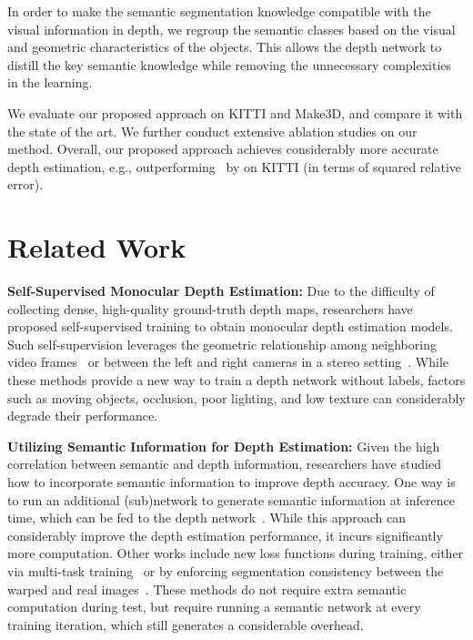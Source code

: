 \documentclass{bmvc2k}
\begin{document}
\hangindent=24pt 
\textbullet \hspace{2pt} In order to make the semantic segmentation knowledge compatible with the visual information in depth, we regroup the semantic classes based on the visual and geometric characteristics of the objects. This allows the depth network to distill the key semantic knowledge while removing the unnecessary complexities in the learning.

\hangindent=24pt 
\textbullet \hspace{2pt} We evaluate our proposed approach on KITTI and Make3D, and compare it with the state of the art. We further conduct extensive ablation studies on our method. Overall, our proposed approach achieves considerably more accurate depth estimation, e.g., outperforming~\cite{godard2019digging} by  on KITTI (in terms of squared relative error). 

\vspace{-10pt}
\section{Related Work}\label{sec:related work}
\vspace{-8pt}
\noindent \textbf{Self-Supervised Monocular Depth Estimation:}
Due to the difficulty of collecting dense, high-quality ground-truth depth maps, researchers have proposed self-supervised training to obtain monocular depth estimation models. Such self-supervision leverages the geometric relationship among neighboring video frames~\cite{zhou2017unsupervised, godard2019digging} or between the left and right cameras in a stereo setting~\cite{godard2017unsupervised}. While these methods provide a new way to train a depth network without labels, factors such as moving objects, occlusion, poor lighting, and low texture can considerably degrade their performance.

\noindent \textbf{Utilizing Semantic Information for Depth Estimation:} Given the high correlation between semantic and depth information, researchers have studied how to incorporate semantic information to improve depth accuracy. One way is to run an additional (sub)network to generate semantic information at inference time, which can be fed to the depth network~\cite{yue2020semi, guizilini2020semantically, kumar2021syndistnet}. While this approach can considerably improve the depth estimation performance, it incurs significantly more computation. Other works include new loss functions during training, either via multi-task training~\cite{tosi2020distilled} or by enforcing segmentation consistency between the warped and real images~\cite{yang2018segstereo, chen2019towards, meng2019signet}. These methods do not require extra semantic computation during test, but require running a semantic network at every training iteration, which still generates a considerable overhead. 
\end{document}
